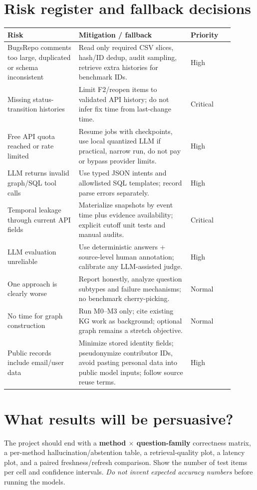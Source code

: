 \documentclass[11pt,a4paper]{article}
\begin{document}
\section{Risk register and fallback decisions}
\begin{longtable}{@{}p{0.29\linewidth}p{0.44\linewidth}p{0.17\linewidth}@{}}\toprule
\textbf{Risk}&\textbf{Mitigation / fallback}&\textbf{Priority}\\\midrule\endhead
BugsRepo comments too large, duplicated or schema inconsistent&Read only required CSV slices, hash/ID dedup, audit sampling, retrieve extra histories for benchmark IDs.&High\\
Missing status-transition histories&Limit F2/reopen items to validated API history; do not infer fix time from last-change time.&Critical\\
Free API quota reached or rate limited&Resume jobs with checkpoints, use local quantized LLM if practical, narrow run, do not pay or bypass provider limits.&High\\
LLM returns invalid graph/SQL tool calls&Use typed JSON intents and allowlisted SQL templates; record parse errors separately.&High\\
Temporal leakage through current API fields&Materialize snapshots by event time plus evidence availability; explicit cutoff unit tests and manual audits.&Critical\\
LLM evaluation unreliable&Use deterministic answers + source-level human annotation; calibrate any LLM-assisted judge.&High\\
One approach is clearly worse&Report honestly, analyze question subtypes and failure mechanisms; no benchmark cherry-picking.&Normal\\
No time for graph construction&Run M0--M3 only; cite existing KG work as background; optional graph remains a stretch objective.&Normal\\
Public records include email/user data&Minimize stored identity fields; pseudonymize contributor IDs, avoid pasting personal data into public model inputs; follow source reuse terms.&High\\
\bottomrule\end{longtable}

\section{What results will be persuasive?}
The project should end with a \textbf{method $\times$ question-family} correctness matrix, a per-method hallucination/abstention table, a retrieval-quality plot, a latency plot, and a paired freshness/refresh comparison. Show the number of test items per cell and confidence intervals. \emph{Do not invent expected accuracy numbers} before running the models.
\end{document}
